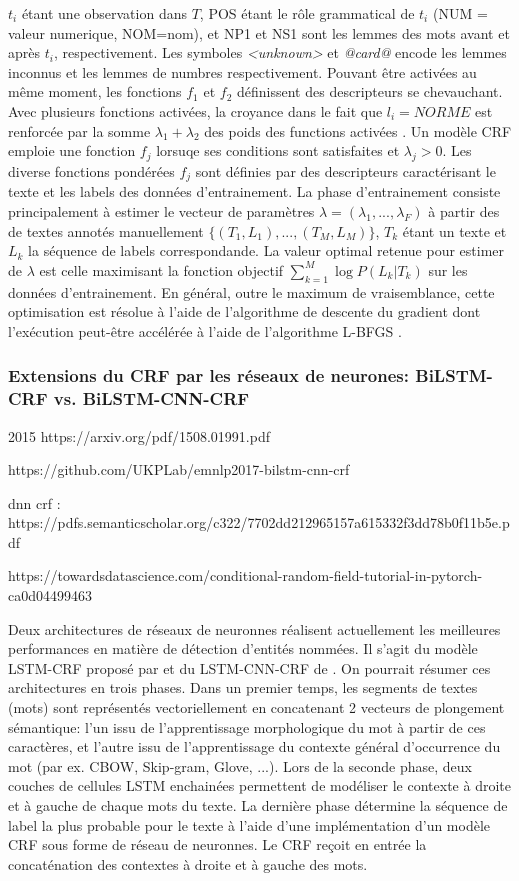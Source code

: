 $t_i$ étant une observation dans $T$, POS étant le rôle grammatical de $t_i$ (NUM = valeur numerique, NOM=nom), et NP1 et NS1 sont les lemmes des mots avant et après $t_i$, respectivement. Les symboles \textit{<unknown>} et \textit{@card@} encode les lemmes inconnus et les lemmes de numbres respectivement. Pouvant être activées au même moment, les fonctions $f_1$ et $f_2$ définissent des descripteurs se chevauchant. Avec plusieurs fonctions activées, la croyance dans le fait que $l_i = NORME$ est renforcée par la somme $\lambda_1 + \lambda_2$ des poids  des functions activées \citep{Zhu2010CRFlecture}.  Un modèle CRF emploie une fonction $f_j$ lorsuqe ses conditions sont satisfaites et $\lambda_j > 0$. Les diverse fonctions pondérées $f_j$ sont définies par des descripteurs caractérisant le texte et les labels des données d'entrainement. La phase d'entrainement consiste principalement à estimer le vecteur de paramètres $\lambda = (\lambda_1,...,\lambda_F)$ à partir des de textes annotés manuellement $ \lbrace (T_1, L_1), ..., (T_M, L_M) \rbrace $, $ T_k $ étant un texte et $ L_k $ la séquence de labels correspondande. La valeur optimal retenue pour estimer de $\lambda$ est celle maximisant la fonction objectif   
$\sum\limits_ {k = 1} ^ M \log P (L_k \vert T_k) $ sur les données d'entrainement. En général, outre le maximum de vraisemblance, cette optimisation est résolue à l'aide de l'algorithme de descente du gradient dont l'exécution peut-être accélérée à l'aide de l'algorithme L-BFGS \citep{liu1989l-bfgs}.

\subsubsection{Extensions du CRF par les réseaux de neurones: BiLSTM-CRF vs. BiLSTM-CNN-CRF}
2015 https://arxiv.org/pdf/1508.01991.pdf

https://github.com/UKPLab/emnlp2017-bilstm-cnn-crf

dnn crf : https://pdfs.semanticscholar.org/c322/7702dd212965157a615332f3dd78b0f11b5e.pdf

https://towardsdatascience.com/conditional-random-field-tutorial-in-pytorch-ca0d04499463

Deux architectures de réseaux de neuronnes réalisent actuellement les meilleures performances en matière de détection d'entités nommées. Il s'agit du modèle LSTM-CRF proposé par \citet{lample2016nnner} et du LSTM-CNN-CRF de \citet{ma2016lstm-cnns-crf}. On pourrait résumer ces architectures en trois phases. Dans un premier temps, les segments de textes (mots) sont représentés vectoriellement en concatenant 2 vecteurs de plongement sémantique: l'un issu de l'apprentissage morphologique du mot à partir de ces caractères, et l'autre issu de l'apprentissage du contexte général d'occurrence du mot (par ex. CBOW, Skip-gram, Glove, ...). Lors de la seconde phase, deux couches de cellules LSTM enchainées permettent de modéliser le contexte à droite et à gauche de chaque mots du texte. La dernière phase détermine la séquence de label la plus probable pour le texte à l'aide d'une implémentation d'un modèle CRF sous forme de réseau de neuronnes. Le CRF reçoit en entrée la concaténation des contextes à droite et à gauche des mots.

